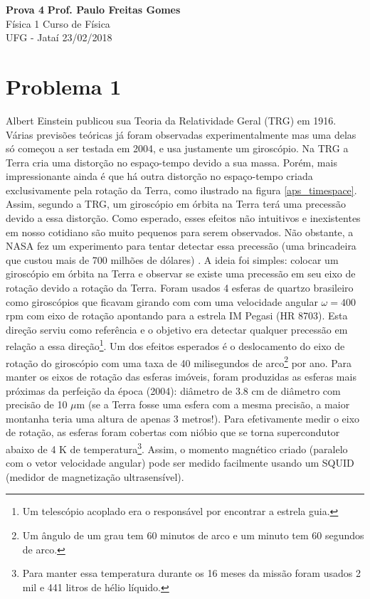 \documentclass[a4paper, 11pt]{article}
\begin{document}
\noindent
\large\textbf{Prova 4} \hfill \textbf{Prof. Paulo Freitas Gomes} \\
\normalsize Física 1 \hfill Curso de Física \\
UFG - Jataí \hfill 23/02/2018 %




\section*{Problema 1}
Albert Einstein publicou sua Teoria da Relatividade Geral (TRG) em 1916. Várias previsões teóricas já foram observadas experimentalmente mas uma delas só começou a ser testada em 2004, e usa justamente um giroscópio. Na TRG a Terra cria uma distorção no espaço-tempo devido a sua massa. Porém, mais impressionante ainda é que há outra distorção no espaço-tempo criada exclusivamente pela rotação da Terra, como ilustrado na figura \ref{aps_timespace}. Assim, segundo a TRG, um giroscópio em órbita na Terra terá uma precessão devido a essa distorção. Como esperado, esses efeitos não intuitivos e inexistentes em nosso cotidiano são muito pequenos para serem observados. Não obstante, a NASA fez um experimento para tentar detectar essa precessão (uma brincadeira que custou mais de 700 milhões de dólares) \cite{Everitt}. A ideia foi simples: colocar um giroscópio em órbita na Terra e observar se existe uma precessão em seu eixo de rotação devido a rotação da Terra. Foram usados 4 esferas de quartzo brasileiro como giroscópios que ficavam girando com com uma velocidade angular $\omega = 400$ rpm com eixo de rotação apontando para a estrela IM Pegasi (HR 8703). Esta direção serviu como referência e o objetivo era detectar qualquer precessão em relação a essa direção\footnote{Um telescópio acoplado era o responsável por encontrar a estrela guia.}. Um dos efeitos esperados é o deslocamento do eixo de rotação do giroscópio com uma taxa de 40 milisegundos de arco\footnote{Um ângulo de um grau tem 60 minutos de arco e um minuto tem 60 segundos de arco.} por ano. Para manter os eixos de rotação das esferas imóveis, foram produzidas as esferas mais próximas da perfeição da época (2004): diâmetro de 3.8 cm de diâmetro com precisão de 10 $\mu$m (se a Terra fosse uma esfera com a mesma precisão, a maior montanha teria uma altura de apenas 3 metros!). Para efetivamente medir o eixo de rotação, as esferas foram cobertas com nióbio que se torna supercondutor abaixo de 4 K de temperatura\footnote{Para manter essa temperatura durante os 16 meses da missão foram usados 2 mil e 441 litros de hélio líquido.}. Assim, o momento magnético criado (paralelo com o vetor velocidade angular) pode ser medido facilmente usando um SQUID (medidor de magnetização ultrasensível).
\end{document}
